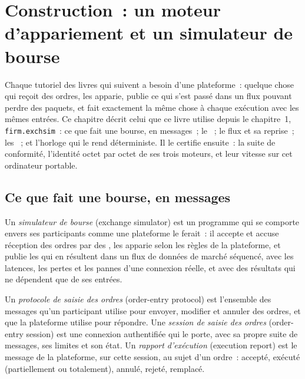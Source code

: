 \chapter{Construction~: un moteur d'appariement et un simulateur de bourse}\label{ch:mx:build-a-matching-engine-and-exchange-simulator}

Chaque tutoriel des livres qui suivent a besoin d'une plateforme~: quelque chose qui reçoit des ordres, les apparie, publie ce qui s'est passé dans un flux pouvant perdre des
paquets, et fait exactement la même chose à chaque exécution avec les mêmes entrées. Ce chapitre décrit celui que ce livre utilise depuis le
chapitre~1, \texttt{firm.exchsim}~: ce que fait une bourse, en messages~; le ~; le flux et sa reprise~; les ~; et
l'horloge qui le rend déterministe. Il le certifie ensuite~: la suite de conformité, l'identité octet par octet de ses trois moteurs, et leur vitesse sur cet
ordinateur portable.

\section{Ce que fait une bourse, en messages}

\begin{definition}\label{def:mx:build-a-matching-engine-and-exchange-simulator:sim}
Un \emph{simulateur de bourse} (exchange simulator) est un programme qui se comporte envers ses participants comme une plateforme le ferait~: il accepte et accuse réception
des ordres par des , les apparie selon les règles de la plateforme, et publie les  qui en résultent dans un flux de données de marché
séquencé, avec les latences, les pertes et les pannes d'une connexion réelle, et avec des résultats qui ne dépendent que de ses entrées.
\end{definition}

\begin{definition}\label{def:mx:build-a-matching-engine-and-exchange-simulator:oe}
Un \emph{protocole de saisie des ordres} (order-entry protocol) est l'ensemble des messages qu'un participant utilise pour envoyer, modifier et annuler des ordres, et que la plateforme utilise
pour répondre. Une \emph{session de saisie des ordres} (order-entry session) est une connexion authentifiée qui le porte, avec sa propre suite de messages, ses limites et
son état. Un \emph{rapport d'exécution} (execution report) est le message de la plateforme, sur cette session, au sujet d'un ordre~: accepté, exécuté (partiellement ou totalement),
annulé, rejeté, remplacé.
\end{definition}

